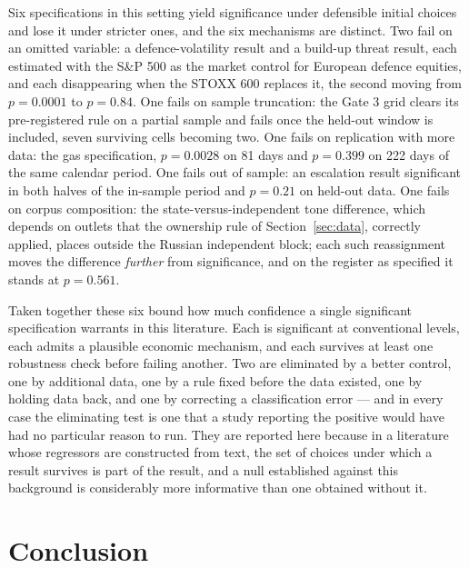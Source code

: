 \documentclass[12pt,a4paper]{article}
\begin{document}
Six specifications in this setting yield significance under defensible initial choices and lose it under stricter ones, and the six mechanisms are distinct. Two fail on an omitted variable: a defence-volatility result and a build-up threat result, each estimated with the S\&P 500 as the market control for European defence equities, and each disappearing when the STOXX 600 replaces it, the second moving from $p = 0.0001$ to $p = 0.84$. One fails on sample truncation: the Gate 3 grid clears its pre-registered rule on a partial sample and fails once the held-out window is included, seven surviving cells becoming two. One fails on replication with more data: the gas specification, $p = 0.0028$ on 81 days and $p = 0.399$ on 222 days of the same calendar period. One fails out of sample: an escalation result significant in both halves of the in-sample period and $p = 0.21$ on held-out data. One fails on corpus composition: the state-versus-independent tone difference, which depends on outlets that the ownership rule of Section~\ref{sec:data}, correctly applied, places outside the Russian independent block; each such reassignment moves the difference \textit{further} from significance, and on the register as specified it stands at $p = 0.561$.

Taken together these six bound how much confidence a single significant specification warrants in this literature. Each is significant at conventional levels, each admits a plausible economic mechanism, and each survives at least one robustness check before failing another. Two are eliminated by a better control, one by additional data, one by a rule fixed before the data existed, one by holding data back, and one by correcting a classification error --- and in every case the eliminating test is one that a study reporting the positive would have had no particular reason to run. They are reported here because in a literature whose regressors are constructed from text, the set of choices under which a result survives is part of the result, and a null established against this background is considerably more informative than one obtained without it.

\section{Conclusion}
\label{sec:conclusion}
\end{document}

